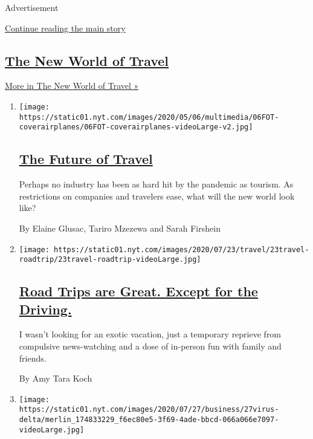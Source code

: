 Advertisement

\protect\hyperlink{after-mid1}{Continue reading the main story}

\hypertarget{the-new-world-of-travel}{%
\subsection{\texorpdfstring{\href{/spotlight/the-new-world-of-travel}{The
New World of
Travel}}{The New World of Travel}}\label{the-new-world-of-travel}}

\href{/spotlight/the-new-world-of-travel}{More in The New World of
Travel »}

\begin{enumerate}
\def\labelenumi{\arabic{enumi}.}
\item
  \texttt{[image: https://static01.nyt.com/images/2020/05/06/multimedia/06FOT-coverairplanes/06FOT-coverairplanes-videoLarge-v2.jpg]}

  \hypertarget{the-future-of-travel}{%
  \subsection{\texorpdfstring{\href{/interactive/2020/05/06/travel/coronavirus-travel-questions.html}{The
  Future of Travel}}{The Future of Travel}}\label{the-future-of-travel}}

  Perhaps no industry has been as hard hit by the pandemic as tourism.
  As restrictions on companies and travelers ease, what will the new
  world look like?

  By Elaine Glusac, Tariro Mzezewa and Sarah Firshein
\item
  \texttt{[image: https://static01.nyt.com/images/2020/07/23/travel/23travel-roadtrip/23travel-roadtrip-videoLarge.jpg]}

  \hypertarget{road-trips-are-great-except-for-the-driving}{%
  \subsection{\texorpdfstring{\href{/2020/07/24/travel/virus-road-trip.html}{Road
  Trips are Great. Except for the
  Driving.}}{Road Trips are Great. Except for the Driving.}}\label{road-trips-are-great-except-for-the-driving}}

  I wasn't looking for an exotic vacation, just a temporary reprieve
  from compulsive news-watching and a dose of in-person fun with family
  and friends.

  By Amy Tara Koch
\item
  \texttt{[image: https://static01.nyt.com/images/2020/07/27/business/27virus-delta/merlin\_174833229\_f6ec80e5-3f69-4ade-bbcd-066a066e7097-videoLarge.jpg]}


\end{enumerate}
